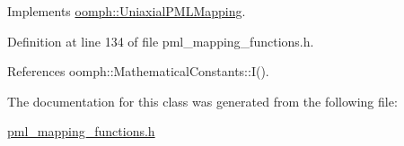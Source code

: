 Implements \hyperlink{classoomph_1_1UniaxialPMLMapping_ae4a0c65e90fe4b90d2ff00b193798588}{oomph\+::\+Uniaxial\+P\+M\+L\+Mapping}.



Definition at line 134 of file pml\+\_\+mapping\+\_\+functions.\+h.



References oomph\+::\+Mathematical\+Constants\+::\+I().



The documentation for this class was generated from the following file\+:\begin{DoxyCompactItemize}
\item 
\hyperlink{pml__mapping__functions_8h}{pml\+\_\+mapping\+\_\+functions.\+h}\end{DoxyCompactItemize}
